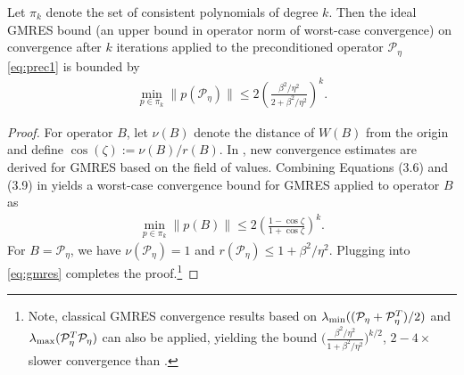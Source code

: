 \documentclass[review]{siamart}
\begin{document}
%
\begin{corollary}\label{cor:gmres}
Let $\pi_k$ denote the set of consistent polynomials of degree $k$. Then the ideal GMRES bound
(an upper bound in operator norm of worst-case convergence) on convergence after $k$ iterations
applied to the preconditioned operator $\mathcal{P}_\eta$ \eqref{eq:prec1} is bounded by
\begin{align*}
\min_{p\in\pi_k} \|p(\mathcal{P}_\eta)\| \leq 2\left(\frac{\beta^2/\eta^2}{2 + \beta^2/\eta^2}\right)^k.
\end{align*}
\end{corollary}
\begin{proof}
For operator $B$, let $\nu(B)$ denote the distance of $W(B)$ from the origin and define
$\cos(\zeta) := \nu(B) / r(B)$. In \cite{liesen2012field}, new convergence
estimates are derived for GMRES based on the field of values. Combining Equations (3.6)
and (3.9) in \cite{liesen2012field} yields a worst-case convergence bound for GMRES
applied to operator $B$ as
%
\begin{align}\label{eq:gmres}
\min_{p\in\pi_k} \|p(B)\| \leq 2\left(\frac{1-\cos\zeta}{1+\cos\zeta}\right)^k.
\end{align}
%
For $B = \mathcal{P}_\eta$, we have $\nu(\mathcal{P}_\eta)= 1$ and
$r(\mathcal{P}_\eta) \leq 1+\beta^2/\eta^2$.
Plugging into \eqref{eq:gmres} completes the proof.\footnote{Note, classical GMRES convergence
results based on $\lambda_{\textnormal{min}}((\mathcal{P}_\eta+\mathcal{P}_\eta^T)/2)$ and
$\lambda_{\textnormal{max}}(\mathcal{P}_\eta^T\mathcal{P}_\eta)$ can also be applied, yielding
the bound $\Big(\tfrac{\beta^2/\eta^2}{1 + \beta^2/\eta^2}\Big)^{k/2}$, $2-4\times$
slower convergence than .}
\end{proof}
%
\end{document}
